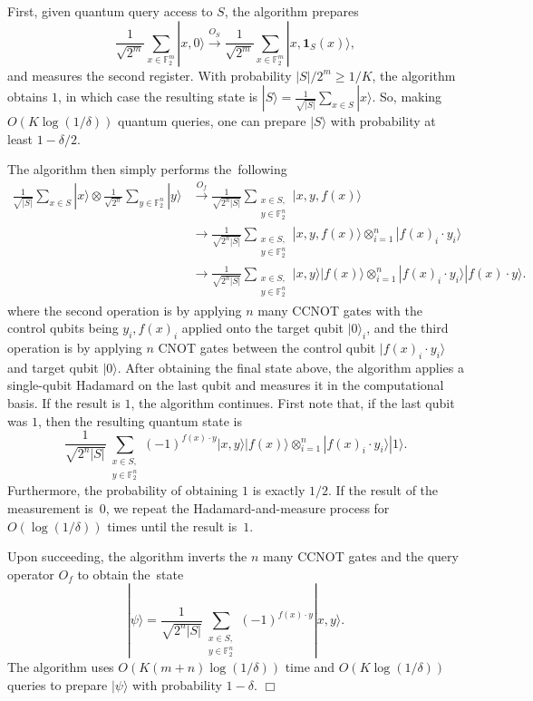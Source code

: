 \documentclass[11pt]{amsart}
\newcommand{\F}{\mathbb{F}} %
\newcommand{\one}{\mathbf{1}}
\newcommand{\ket}[1]{|#1\rangle}
\theoremstyle{plain}
\theoremstyle{definition}
\theoremstyle{remark}
\renewenvironment{proof}[1][]{
    	\begin{trivlist}
     	\item[\hspace{\labelsep}{\em\noindent Proof#1:\/}]}
     	{{\hfill$\Box$}
    	\end{trivlist}
  }
\begin{document}
\begin{proof}
First, given quantum query access to $S$, the algorithm prepares
$$
\frac{1}{\sqrt{2^m}}\sum_{x\in \F_2^m} \ket{x,0} \stackrel{O_S}{\longrightarrow} \frac{1}{\sqrt{2^m}}\sum_{x\in \F_2^m} \ket{x,\one_S(x)},
$$
and measures the second register. With probability $|S|/2^m \geq 1/K$, the algorithm obtains $1$, in which case the resulting state is $\ket{S}=\frac{1}{\sqrt{|S|}}\sum_{x\in S}\ket{x}$. So, making $O(K \log(1/\delta))$ quantum queries, one can prepare $\ket{S}$ with probability at least $1-\delta/2$.

The algorithm then simply performs the~following
\begin{align*}
\frac{1}{\sqrt{|S|}}\sum_{x\in S}\ket{x}\otimes \frac{1}{\sqrt{2^n}}\sum_{y\in \F_2^n}\ket{y} &\stackrel{O_f}\longrightarrow \frac{1}{\sqrt{2^n|S|}}\sum_{\substack{x\in S,\\y\in \F_2^n}}\ket{x,y,f(x)}\\
&\longrightarrow \frac{1}{\sqrt{2^n|S|}}\sum_{\substack{x\in S,\\y\in \F_2^n}}\ket{x,y,f(x)}\otimes_{i=1}^n\ket{f(x)_i\cdot y_i}\\
&\longrightarrow \frac{1}{\sqrt{2^n|S|}}\sum_{\substack{x\in S,\\y\in \F_2^n}}\ket{x,y}\ket{f(x)}\otimes_{i=1}^n\ket{f(x)_i\cdot y_i} \ket{f(x)\cdot y}.
\end{align*}
where the second operation is by applying  $n$ many \textsf{CCNOT} gates with the control qubits being $y_i,f(x)_i$ applied onto the target qubit $\ket{0}_i$,
and the third operation is by applying $n$ \textsf{CNOT} gates between the control qubit $\ket{f(x)_i\cdot y_i}$ and target qubit $\ket{0}$. After obtaining the final state above, the algorithm applies a single-qubit Hadamard on the last qubit and measures it in the computational basis. If the result is $1$, the algorithm continues. First note that, if the last qubit was $1$, then the resulting quantum state is
\begin{equation*}
     \frac{1}{\sqrt{2^n |S|}}\sum_{\substack{x\in S,\\y\in \F_2^n}}(-1)^{f(x)\cdot y}\ket{x,y}\ket{f(x)}\otimes_{i=1}^n\ket{f(x)_i\cdot y_i} \ket{1}.
\end{equation*}
Furthermore, the probability of obtaining $1$ is exactly $1/2$.
If the result of the measurement is~$0$, we repeat the Hadamard-and-measure process for $O(\log(1/\delta))$ times until the result is~$1$.

Upon succeeding, the algorithm inverts the $n$ many \textsf{CCNOT} gates and the query operator $O_f$ to obtain the~state
$$
\ket{\psi}= \frac{1}{\sqrt{2^n |S|}}\sum_{\substack{x\in S,\\y\in \F_2^n}}(-1)^{f(x)\cdot y}\ket{x,y}.
$$
The algorithm uses $O(K(m+n) \log(1/\delta))$ time and $O(K \log(1/\delta))$ queries to prepare $\ket{\psi}$ with probability $1-\delta$.
\end{proof}
\end{document}
